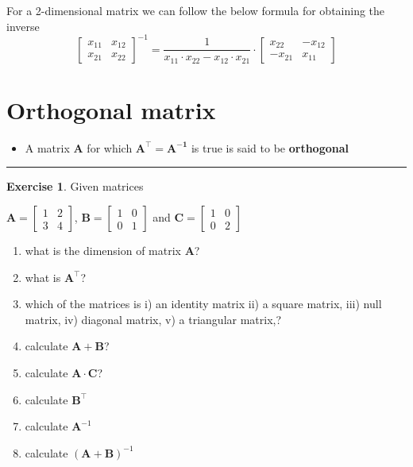 \documentclass[
]{book}
\providecommand{\tightlist}{%
  \setlength{\itemsep}{0pt}\setlength{\parskip}{0pt}}
\theoremstyle{definition}
\theoremstyle{definition}
\theoremstyle{definition}
\newtheorem{exercise}{Exercise}[chapter]
\theoremstyle{remark}
\begin{document}
For a 2-dimensional matrix we can follow the below formula for obtaining the inverse
\[\begin{bmatrix}
  x_{11} & x_{12}   \\
  x_{21} & x_{22} 
\end{bmatrix}^{-1} = \frac{1}{x_{11} \cdot x_{22} - x_{12} \cdot x_{21}} \cdot \begin{bmatrix}
  x_{22} & -x_{12}   \\
  -x_{21} & x_{11} 
\end{bmatrix}\]

\hypertarget{orthogonal-matrix}{%
\section{Orthogonal matrix}\label{orthogonal-matrix}}

\begin{itemize}
\tightlist
\item
  A matrix \(\mathbf{A}\) for which \(\mathbf{A^\top} = \mathbf{A^{-1}}\) is true is said to be \textbf{orthogonal}
\end{itemize}

\begin{center}\rule{0.5\linewidth}{0.5pt}\end{center}

\begin{exercise}
\protect\hypertarget{exr:m-matrix}{}{\label{exr:m-matrix} }
Given matrices

\(\mathbf{A} = \begin{bmatrix}  1 & 2 \\  3 & 4  \end{bmatrix}\),
\(\mathbf{B} = \begin{bmatrix}  1 & 0 \\  0 & 1  \end{bmatrix}\) and \(\mathbf{C} = \begin{bmatrix}  1 & 0 \\  0 & 2  \end{bmatrix}\)

\begin{enumerate}
\def\labelenumi{\alph{enumi})}
\tightlist
\item
  what is the dimension of matrix \(\mathbf{A}\)?
\item
  what is \(\mathbf{A}^\top\)?
\item
  which of the matrices is i) an identity matrix ii) a square matrix, iii) null matrix, iv) diagonal matrix, v) a triangular matrix,?
\item
  calculate \(\mathbf{A} + \mathbf{B}\)?
\item
  calculate \(\mathbf{A} \cdot \mathbf{C}\)?
\item
  calculate \(\mathbf{B}^\top\)
\item
  calculate \(\mathbf{A}^{-1}\)
\item
  calculate \((\mathbf{A} + \mathbf{B})^{-1}\)
\end{enumerate}
\end{exercise}
\end{document}
